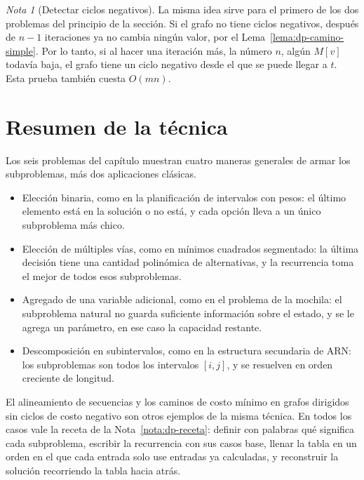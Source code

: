 \documentclass[12pt, spanish, oneside, openany]{book}
\theoremstyle{uprightplain}
\theoremstyle{definition}
\theoremstyle{remark}
\newtheorem{nota}[teorema]{Nota}
\theoremstyle{definition}
\begin{document}
\begin{nota}[Detectar ciclos negativos]
\label{nota:dp-bf-ciclos}
La misma idea sirve para el primero de los dos problemas del principio de la sección. Si el grafo no tiene ciclos negativos, después de $n-1$ iteraciones ya no cambia ningún valor, por el Lema~\ref{lema:dp-camino-simple}. Por lo tanto, si al hacer una iteración más, la número $n$, algún $M[v]$ todavía baja, el grafo tiene un ciclo negativo desde el que se puede llegar a $t$. Esta prueba también cuesta $O(mn)$.
\end{nota}


\section{Resumen de la técnica}
\label{sec:dp-resumen}

Los seis problemas del capítulo muestran cuatro maneras generales de armar los subproblemas, más dos aplicaciones clásicas.

\begin{itemize}
    \item Elección binaria, como en la planificación de intervalos con pesos: el último elemento está en la solución o no está, y cada opción lleva a un único subproblema más chico.
    \item Elección de múltiples vías, como en mínimos cuadrados segmentado: la última decisión tiene una cantidad polinómica de alternativas, y la recurrencia toma el mejor de todos esos subproblemas.
    \item Agregado de una variable adicional, como en el problema de la mochila: el subproblema natural no guarda suficiente información sobre el estado, y se le agrega un parámetro, en ese caso la capacidad restante.
    \item Descomposición en subintervalos, como en la estructura secundaria de ARN: los subproblemas son todos los intervalos $[i,j]$, y se resuelven en orden creciente de longitud.
\end{itemize}

El alineamiento de secuencias y los caminos de costo mínimo en grafos dirigidos sin ciclos de costo negativo son otros ejemplos de la misma técnica. En todos los casos vale la receta de la Nota~\ref{nota:dp-receta}: definir con palabras qué significa cada subproblema, escribir la recurrencia con sus casos base, llenar la tabla en un orden en el que cada entrada solo use entradas ya calculadas, y reconstruir la solución recorriendo la tabla hacia atrás.
\end{document}
